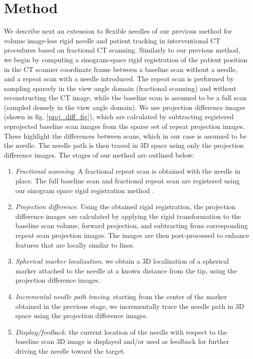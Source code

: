 \documentclass[letterpaper, 11 pt, conference]{ieeeconf} %
\begin{document}
\section{Method}

We describe next an extension to flexible needles of our previous method \cite{medan2017reduced} for volume image-less rigid needle and patient tracking in interventional CT procedures based on fractional CT scanning. Similarly to our previous method, we begin by computing a sinogram-space rigid registration of the patient position in the CT scanner coordinate frame between a baseline scan without a needle, and a repeat scan with a needle introduced. The repeat scan is performed by sampling sparsely in the view angle domain (fractional scanning) and without reconstructing the CT image, while the baseline scan is assumed to be a full scan (sampled densely in the view angle domain). We use projection difference images (shown in fig. \ref{proj_diff_fig}), which are calculated by subtracting registered reprojected baseline scan images from the sparse set of repeat projection images. These highlight the differences between scans, which in our case is assumed to be the needle. The needle path is then traced in 3D space using only the projection difference images. The stages of our method are outlined below:
\begin{enumerate}
\item \textit{Fractional scanning}. A fractional repeat scan is obtained with the needle in place. The full baseline scan and fractional repeat scan are registered using our sinogram space rigid registration method \cite{medan2017sparse}.
\item \textit{Projection difference}. Using the obtained rigid registration, the projection difference images are calculated by applying the rigid transformation to the baseline scan volume, forward projection, and subtracting from corresponding repeat scan projection images. The images are then post-processed to enhance features that are locally similar to lines.
\item \textit{Spherical marker localization}. we obtain a 3D localization of a spherical marker attached to the needle at a known distance from the tip, using the projection difference images.
\item \textit{Incremental needle path tracing}. starting from the center of the marker obtained in the previous stage, we incrementally trace the needle path in 3D space using the projection difference images.
\item \textit{Display/feedback}. the current location of the needle with respect to the baseline scan 3D image is displayed and/or used as feedback for further driving the needle toward the target.
\end{enumerate}
\end{document}

